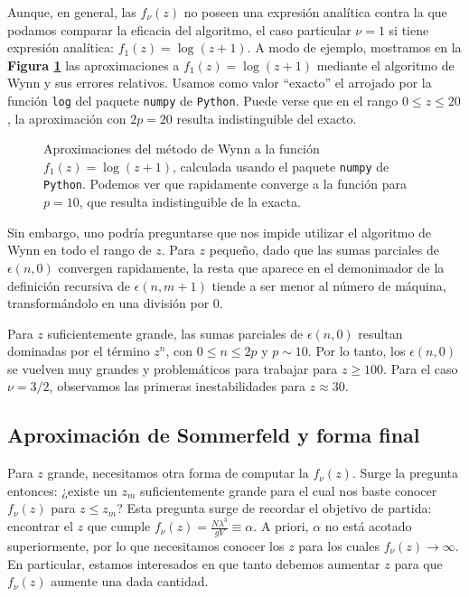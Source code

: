 Aunque, en general, las $f_\nu(z)$ no poseen una expresión analítica contra la que podamos comparar la eficacia del algoritmo, el caso particular $\nu=1$ si tiene
expresión analítica: $f_1(z) = \log(z+1)$.
A modo de ejemplo, mostramos en la \textbf{Figura \ref{fig:ej_wynn_log}} las aproximaciones a $f_1(z) = \log(z+1)$ mediante el algoritmo de Wynn y sus errores relativos.
Usamos como valor ``exacto'' el arrojado por la función \texttt{log} del paquete \texttt{numpy} de \texttt{Python}.
Puede verse que en el rango $0\leq z\leq 20$, la aproximación con $2p=20$ resulta indistinguible del exacto.

\begin{figure}[H]
	\centering
	\caption{Aproximaciones del método de Wynn a la función $f_1(z) = \log(z+1)$, calculada usando el paquete \texttt{numpy} de \texttt{Python}.
	Podemos ver que rapidamente converge a la función para $p=10$, que resulta indistinguible de la exacta.}
	\label{fig:ej_wynn_log}
\end{figure}

Sin embargo, uno podría preguntarse que nos impide utilizar el algoritmo de Wynn en todo el rango de $z$.
Para $z$ pequeño, dado que las sumas parciales de $\epsilon(n,0)$ convergen rapidamente, la resta que aparece en el demonimador de la definición recursiva de
$\epsilon(n, m+1)$ tiende a ser menor al número de máquina, transformándolo en una división por $0$.

Para $z$ suficientemente grande, las sumas parciales de $\epsilon(n,0)$ resultan dominadas por el término $z^n$, con $0\leq n\leq 2p$ y $p\sim 10$.
Por lo tanto, los $\epsilon(n,0)$ se vuelven muy grandes y problemáticos para trabajar para $z\geq 100$.
Para el caso $\nu=3/2$, observamos las primeras inestabilidades para $z\approx 30$.


\subsection{Aproximación de Sommerfeld y forma final}

Para $z$ grande, necesitamos otra forma de computar la $f_\nu(z)$.
Surge la pregunta entonces: ¿existe un $z_m$ suficientemente grande para el cual nos baste conocer $f_\nu(z)$ para $z\leq z_m$?
Esta pregunta surge de recordar el objetivo de partida: encontrar el $z$ que cumple $f_\nu(z)=\frac{N\lambda^3}{gV}\equiv \alpha$.
A priori, $\alpha$ no está acotado superiormente, por lo que necesitamos conocer los $z$ para los cuales $f_\nu(z)\to\infty$.
En particular, estamos interesados en que tanto debemos aumentar $z$ para que $f_\nu(z)$ aumente una dada cantidad.

